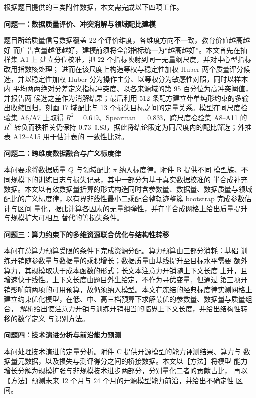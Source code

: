 \documentclass[bwprint]{gmcmthesis}
\numberwithin{equation}{section}
\numberwithin{figure}{section}
\numberwithin{table}{section}
\begin{document}
根据题目提供的三类附件数据，本文需完成以下四项工作。

\textbf{问题一：数据质量评价、冲突消解与领域配比建模}

题目所给质量信号数据覆盖 22 个评价维度，各维度方向不一致，教育价值越高越好
而广告含量越低越好，建模前须将全部指标统一为“越高越好”。本文首先在抽样集 A1 上
建立分位校准，把 22 个指标映射到同一无量纲尺度，并对中心型指标改用指数核处理；
进而在该尺度上构造等权与稳定性加权 Huber 两个质量评分候选，并以稳定性加权 Huber
分为操作主分、以等权分为敏感性对照，同时以样本内
平均两两绝对分差定义指标冲突度、以各来源域的第 95 百分位为高冲突阈值，并报告两
候选之差作为消解结果；最后利用 512 条配方建立带单纯形约束的多输出收缩回归，刻画
17 域配比与 13 个损失目标之间的定量关系。模型在同尺度检验集 A6/A7 上取得
$R^2=0.619$、Spearman $=0.833$，跨尺度检验集 A8--A11 的 $R^2$ 转负而秩相关仍保持
$0.73$--$0.83$，据此将结论限定为同尺度内的配比筛选；外推表 A12--A15 用于估计表的
一致性比对。

\textbf{问题二：跨维度数据融合与广义标度律}

本问要求将数据质量 $Q$ 与领域配比 $\pi$ 纳入标度律。附件 B 提供不同
模型族、不同规模下的训练日志与损失记录，其中一部分为基于真实数据校准的
半合成补充数据。本文以有效数据量折算的形式构造同时含参数量、数据量、数据质量与领域
配比的广义标度律，以有界非线性最小二乘配合整轨迹整簇 bootstrap 完成参数估计与区间
量化，据此计算各因素的无量纲弹性，并在半合成网格上给出质量提升与规模扩大可相互
替代的等损失条件。

\textbf{问题三：算力约束下的多维资源联合优化与结构性转移}

本问在总算力预算受限的条件下完成资源分配。算力预算由三部分消耗：基础
训练开销随参数量与数据量的乘积增长；数据质量由基线提升至目标水平需要
额外算力，其规模取决于成本函数的形式；长文本注意力开销随上下文长度
上升，且增速快于线性。上下文长度由题目外生给定，不作为寻优变量，但通过
第三项开销影响前两项的可用预算，故仍须纳入模型。本文在冻结的经典标度律实测网格上
建立约束优化模型，在低、中、高三档预算下求解最优的参数量、数据量与质量组合，
解析给出使注意力开销与训练开销相当的临界上下文长度，并给出结构性转移的数学定义
与识别方法。

\textbf{问题四：技术演进分析与前沿能力预测}

本问处理技术演进的定量分析。附件 C 提供开源模型的能力评测结果、算力与
数据量元数据，以及损失与测评得分之间的桥接数据。本文以【方法】将模型
能力增长分解为规模扩张与非规模技术进步两部分，分别量化二者的贡献占比，
再以【方法】预测未来 12 个月与 24 个月的开源模型能力前沿，并给出不确定性
区间。
\end{document}
